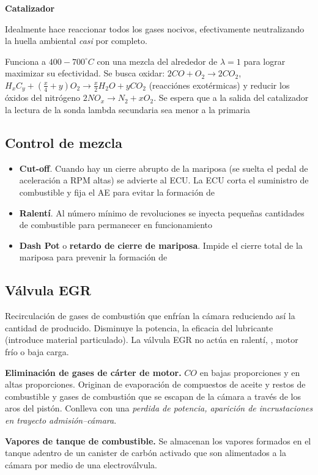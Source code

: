 {\bf Catalizador}

Idealmente hace reaccionar todos los gases nocivos, efectivamente neutralizando la huella ambiental \emph{casi} por completo. 

Funciona a $400-700 ^\circ C$ con una mezcla del alrededor de $\lambda =1$ para lograr maximizar su efectividad. Se busca oxidar: $2CO+O_2\rightarrow 2CO_2$, $H_xC_y+(\frac{x}{4}+y) O_2\rightarrow \frac{x}{2} H_2O+y CO_2$ (reacciónes exotérmicas)  y reducir los óxidos del nitrógeno $2NO_x\rightarrow N_2+xO_2$. Se espera que a la salida del catalizador la lectura de la sonda lambda secundaria sea menor a la primaria
\subsection{Control de mezcla}
\begin{itemize}
    \item \textbf{Cut-off}. Cuando hay un cierre abrupto de la mariposa (se suelta el pedal de aceleración a RPM altas) se advierte al ECU. La ECU corta el suministro de combustible y fija el AE para evitar la formación de \HC
  
    \item \textbf{Ralentí}. Al número mínimo de revoluciones se inyecta pequeñas cantidades de combustible para permanecer en funcionamiento
    \item \textbf{Dash Pot} o \textbf{retardo de cierre de mariposa}. Impide el cierre total de la mariposa para prevenir la formación de \HC
\end{itemize}
\subsection{Válvula EGR}
Recirculación de gases de combustión que enfrían la cámara reduciendo así la cantidad de \NX producido. Disminuye la potencia, la eficacia del lubricante (introduce material particulado). La válvula EGR no actúa en ralentí, \NX, motor frío o baja carga.

{\bf Eliminación de gases de cárter de motor.}
$CO$ en bajas proporciones y \HC en altas proporciones. Originan de evaporación de compuestos de aceite y restos de combustible y gases de combustión que se escapan de la cámara a través de los aros del pistón. Conlleva con una \emph{perdida de potencia, aparición de incrustaciones en trayecto admisión--cámara}.

{\bf Vapores de tanque de combustible.} 
Se almacenan los vapores formados en el tanque adentro de un canister de carbón activado que son alimentados a la cámara por medio de una electroválvula.

